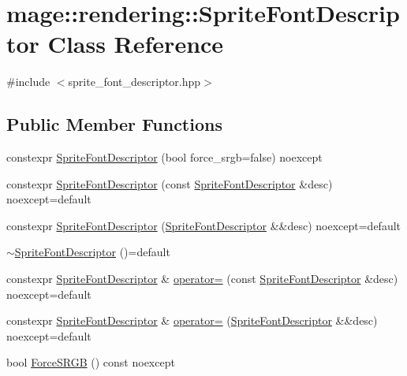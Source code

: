 \hypertarget{classmage_1_1rendering_1_1_sprite_font_descriptor}{}\section{mage\+:\+:rendering\+:\+:Sprite\+Font\+Descriptor Class Reference}
\label{classmage_1_1rendering_1_1_sprite_font_descriptor}


{\ttfamily \#include $<$sprite\+\_\+font\+\_\+descriptor.\+hpp$>$}

\subsection*{Public Member Functions}
\begin{DoxyCompactItemize}
\item 
constexpr \mbox{\hyperlink{classmage_1_1rendering_1_1_sprite_font_descriptor_a82c66afe6cc815ad223c15642cd2ac00}{Sprite\+Font\+Descriptor}} (bool force\+\_\+srgb=false) noexcept
\item 
constexpr \mbox{\hyperlink{classmage_1_1rendering_1_1_sprite_font_descriptor_a168e12be8a7029e5f5dcffe058100bd6}{Sprite\+Font\+Descriptor}} (const \mbox{\hyperlink{classmage_1_1rendering_1_1_sprite_font_descriptor}{Sprite\+Font\+Descriptor}} \&desc) noexcept=default
\item 
constexpr \mbox{\hyperlink{classmage_1_1rendering_1_1_sprite_font_descriptor_a1a84c848b090000d444fdade6ca171e2}{Sprite\+Font\+Descriptor}} (\mbox{\hyperlink{classmage_1_1rendering_1_1_sprite_font_descriptor}{Sprite\+Font\+Descriptor}} \&\&desc) noexcept=default
\item 
\mbox{\hyperlink{classmage_1_1rendering_1_1_sprite_font_descriptor_adef19c1e38ed5a685578a855b17c08bc}{$\sim$\+Sprite\+Font\+Descriptor}} ()=default
\item 
constexpr \mbox{\hyperlink{classmage_1_1rendering_1_1_sprite_font_descriptor}{Sprite\+Font\+Descriptor}} \& \mbox{\hyperlink{classmage_1_1rendering_1_1_sprite_font_descriptor_a41d694f929b38995aca3ccb7ee79215e}{operator=}} (const \mbox{\hyperlink{classmage_1_1rendering_1_1_sprite_font_descriptor}{Sprite\+Font\+Descriptor}} \&desc) noexcept=default
\item 
constexpr \mbox{\hyperlink{classmage_1_1rendering_1_1_sprite_font_descriptor}{Sprite\+Font\+Descriptor}} \& \mbox{\hyperlink{classmage_1_1rendering_1_1_sprite_font_descriptor_a40479c5c747c6cbcb5fdf09e6027d650}{operator=}} (\mbox{\hyperlink{classmage_1_1rendering_1_1_sprite_font_descriptor}{Sprite\+Font\+Descriptor}} \&\&desc) noexcept=default
\item 
bool \mbox{\hyperlink{classmage_1_1rendering_1_1_sprite_font_descriptor_a4d7ab52dc3380f1c88b847248825438d}{Force\+S\+R\+GB}} () const noexcept
\end{DoxyCompactItemize}

